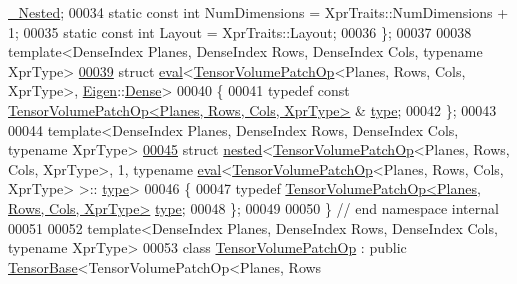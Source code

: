 \begin{DoxyCode}
      \hyperlink{group___sparse_core___module}{\_Nested};
00034   \textcolor{keyword}{static} \textcolor{keyword}{const} \textcolor{keywordtype}{int} NumDimensions = XprTraits::NumDimensions + 1;
00035   \textcolor{keyword}{static} \textcolor{keyword}{const} \textcolor{keywordtype}{int} Layout = XprTraits::Layout;
00036 \};
00037 
00038 \textcolor{keyword}{template}<DenseIndex Planes, DenseIndex Rows, DenseIndex Cols, \textcolor{keyword}{typename} XprType>
\hyperlink{struct_eigen_1_1internal_1_1eval_3_01_tensor_volume_patch_op_3_01_planes_00_01_rows_00_01_cols_0fbbbfea9d11ccf46d4c751aec1ba44e4}{00039} \textcolor{keyword}{struct }\hyperlink{struct_eigen_1_1internal_1_1eval}{eval}<\hyperlink{class_eigen_1_1_tensor_volume_patch_op}{TensorVolumePatchOp}<Planes, Rows, Cols, XprType>, 
      \hyperlink{namespace_eigen}{Eigen}::\hyperlink{struct_eigen_1_1_dense}{Dense}>
00040 \{
00041   \textcolor{keyword}{typedef} \textcolor{keyword}{const} \hyperlink{class_eigen_1_1_tensor_volume_patch_op}{TensorVolumePatchOp<Planes, Rows, Cols, XprType>}
      & \hyperlink{class_eigen_1_1_tensor_volume_patch_op}{type};
00042 \};
00043 
00044 \textcolor{keyword}{template}<DenseIndex Planes, DenseIndex Rows, DenseIndex Cols, \textcolor{keyword}{typename} XprType>
\hyperlink{struct_eigen_1_1internal_1_1nested_3_01_tensor_volume_patch_op_3_01_planes_00_01_rows_00_01_cols82921df878abaf81e0e304ae8f39bd52}{00045} \textcolor{keyword}{struct }\hyperlink{struct_eigen_1_1internal_1_1nested}{nested}<\hyperlink{class_eigen_1_1_tensor_volume_patch_op}{TensorVolumePatchOp}<Planes, Rows, Cols, XprType>, 1, typename 
      \hyperlink{struct_eigen_1_1internal_1_1eval}{eval}<\hyperlink{class_eigen_1_1_tensor_volume_patch_op}{TensorVolumePatchOp}<Planes, Rows, Cols, XprType> >::
      \hyperlink{class_eigen_1_1_tensor_volume_patch_op}{type}>
00046 \{
00047   \textcolor{keyword}{typedef} \hyperlink{class_eigen_1_1_tensor_volume_patch_op}{TensorVolumePatchOp<Planes, Rows, Cols, XprType>} 
      \hyperlink{class_eigen_1_1_tensor_volume_patch_op}{type};
00048 \};
00049 
00050 \}  \textcolor{comment}{// end namespace internal}
00051 
00052 \textcolor{keyword}{template}<DenseIndex Planes, DenseIndex Rows, DenseIndex Cols, \textcolor{keyword}{typename} XprType>
00053 \textcolor{keyword}{class }\hyperlink{class_eigen_1_1_tensor_volume_patch_op}{TensorVolumePatchOp} : \textcolor{keyword}{public} \hyperlink{class_eigen_1_1_tensor_base}{TensorBase}<TensorVolumePatchOp<Planes, Rows

\end{DoxyCode}
